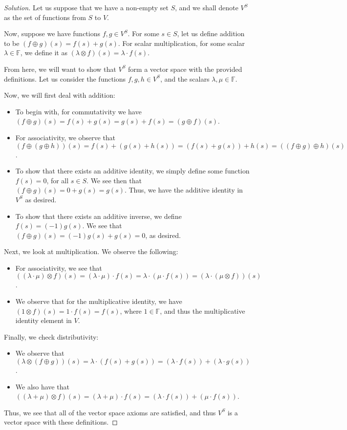 \documentclass{article}
\newenvironment{solution}{\begin{proof}[Solution]}{\end{proof}}
\begin{document}
\begin{solution}
	Let us suppose that we have a non-empty set $S$, and we shall denote $V^{S}$ as the set of functions from $S$ to $V$.
	
	Now, suppose we have functions $f, g \in V^{S}$. For some $s \in S$, let us define addition to be $(f \oplus g)(s) = f(s) + g(s)$. For scalar multiplication, for some scalar $\lambda \in \mathbb{F}$, we define it as $(\lambda \otimes f)(s) = \lambda \cdot f(s)$.
	
	From here, we will want to show that $V^{S}$ form a vector space with the provided definitions. Let us consider the functions $f,g,h \in V^{S}$, and the scalars $\lambda, \mu \in \mathbb{F}$.
	
	Now, we will first deal with addition:
	\begin{itemize}
		\item To begin with, for commutativity we have $(f \oplus g)(s) = f(s) + g(s) = g(s) + f(s) = (g \oplus f)(s)$.
	
		\item For associativity, we observe that $(f \oplus (g \oplus h))(s) = f(s) + (g(s) + h(s)) = (f(s) + g(s)) + h(s) = ((f \oplus g) \oplus h)(s)$.
		
		\item To show that there exists an additive identity, we simply define some function $f(s) = 0$, for all $s \in S$. We see then that $(f \oplus g)(s) = 0 + g(s) = g(s)$. Thus, we have the additive identity in $V^{S}$ as desired.
		
		\item To show that there exists an additive inverse, we define $f(s) = (-1)g(s)$. We see that $(f \oplus g)(s) = (-1)g(s) + g(s) = 0$, as desired.
	\end{itemize}

	Next, we look at multiplication. We observe the following:
	\begin{itemize}
		\item For associativity, we see that $( (\lambda \cdot \mu) \otimes f)(s) = (\lambda \cdot \mu) \cdot f(s) = \lambda \cdot (\mu \cdot f(s)) = (\lambda \cdot (\mu \otimes f))(s)$.
		
		\item We observe that for the multiplicative identity, we have $(1 \otimes f)(s) = 1 \cdot f(s) = f(s)$, where $1 \in \mathbb{F}$, and thus the multiplicative identity element in $V$.
	\end{itemize}
	
	Finally, we check distributivity:
	\begin{itemize}
		\item We observe that $(\lambda \otimes (f \oplus g))(s) = \lambda \cdot (f(s) + g(s)) = (\lambda \cdot f(s)) + (\lambda \cdot g(s))$.
		\item We also have that $( (\lambda + \mu) \otimes f)(s) = (\lambda + \mu) \cdot f(s) = (\lambda \cdot f(s)) + (\mu \cdot f(s))$.
	\end{itemize}

	Thus, we see that all of the vector space axioms are satisfied, and thus $V^{S}$ is a vector space with these definitions.
\end{solution}
\end{document}
